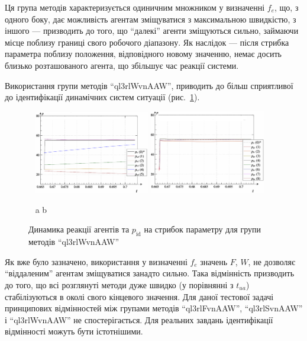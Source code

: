 \documentclass[a4paper,13pt]{atuaref}
\begin{document}
Ця група методів характеризується одиничним множником у визначенні $f_e$, що,
з одного боку, дає можливість агентам зміщуватися з максимальною швидкістю, з
іншого --- призводить до того, що ``далекі'' агенти зміщуються сильно,
займаючи місце поблизу границі свого робочого діапазону. Як наслідок --- після
стрибка параметра поблизу положення, відповідного новому значенню, немає
досить близько розташованого агента, що збільшує час реакції системи.

Використання  групи методів ``ql3rlWvnAAW'',
приводить до більш сприятливої до ідентифікації динамічних систем ситуації
(рис.~\ref{atu:f:ql3rlWvnAAW_sign}).

\begin{figure}[htb!]
  \centerline{
    ~ \hfill
    \includegraphics[width=0.45\textwidth]{p3/p/sign/qls-p_t_pi_m_ql3rlWvnAAW_sign_xl.png}
    \hfill
    \includegraphics[width=0.45\textwidth]{p3/p/sign/qls-p_t_p_m_ql3rlWvnAAW_sign_xl.png}
    \hfill ~
  }
  \vspace{-1.5ex}
  \begin{center}
    ~ \hfill a \hfill\hfill b  \hfill ~
  \end{center}
  \vspace{-2.5ex}
  \caption{Динамика реакції агентів та $p_\mathrm{id}$ на стрибок параметру для групи методів ``ql3rlWvnAAW''}
  \label{atu:f:ql3rlWvnAAW_sign}
\end{figure}

Як вже було зазначено, використання у визначенні $f_e$ значень $F$, $W$,
не дозволяє ``віддаленим'' агентам зміщуватися занадто сильно. Така відмінність
призводить до того, що всі розглянуті методи дуже швидко (у порівнянні з $t_{ua}$)
стабілізуються в околі свого кінцевого значення.
%
Для даної тестової задачі принципових відмінностей між групами методів
``ql3rlFvnAAW'', ``ql3rlSvnAAW'' і ``ql3rlWvnAAW'' не спостерігається. Для
реальних завдань ідентифікації відмінності можуть бути істотнішими.
\end{document}
